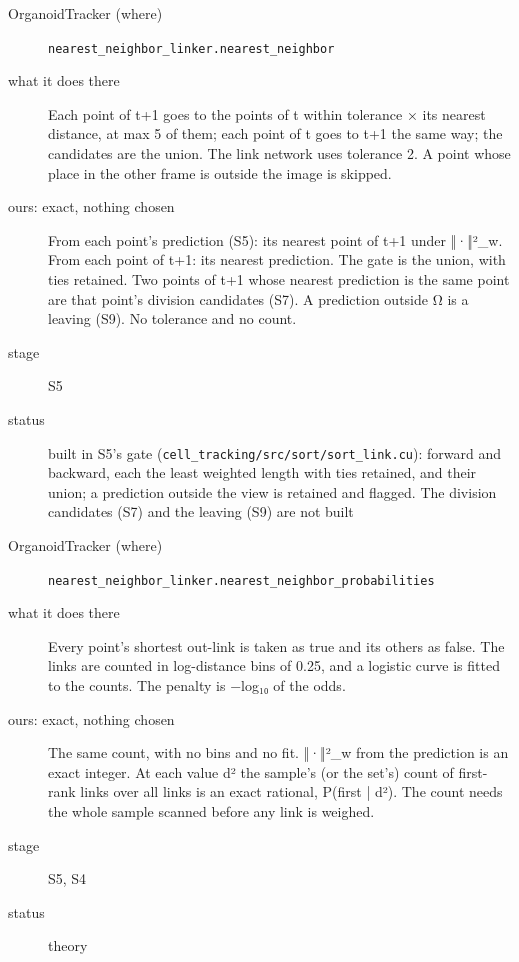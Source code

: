 \begin{description}
\item[{OrganoidTracker (where)}] \texttt{nearest\_\allowbreak{}neighbor\_\allowbreak{}linker.\allowbreak{}nearest\_\allowbreak{}neighbor}
\item[{what it does there}] Each point of t+1 goes to the points of t within tolerance × its nearest distance, at max 5 of them; each point of t goes to t+1 the same way; the candidates are the union. The link network uses tolerance 2. A point whose place in the other frame is outside the image is skipped.
\item[{ours: exact, nothing chosen}] From each point's prediction (S5): its nearest point of t+1 under ‖·‖²\_\allowbreak{}w. From each point of t+1: its nearest prediction. The gate is the union, with ties retained. Two points of t+1 whose nearest prediction is the same point are that point's division candidates (S7). A prediction outside Ω is a leaving (S9). No tolerance and no count.
\item[{stage}] S5
\item[{status}] built in S5's gate (\texttt{cell\_\allowbreak{}tracking/\allowbreak{}src/\allowbreak{}sort/\allowbreak{}sort\_\allowbreak{}link.\allowbreak{}cu}): forward and backward, each the least weighted length with ties retained, and their union; a prediction outside the view is retained and flagged. The division candidates (S7) and the leaving (S9) are not built
\end{description}

\begin{description}
\item[{OrganoidTracker (where)}] \texttt{nearest\_\allowbreak{}neighbor\_\allowbreak{}linker.\allowbreak{}nearest\_\allowbreak{}neighbor\_\allowbreak{}probabilities}
\item[{what it does there}] Every point's shortest out-link is taken as true and its others as false. The links are counted in log-distance bins of 0.25, and a logistic curve is fitted to the counts. The penalty is −log₁₀ of the odds.
\item[{ours: exact, nothing chosen}] The same count, with no bins and no fit. ‖·‖²\_\allowbreak{}w from the prediction is an exact integer. At each value d² the sample's (or the set's) count of first-rank links over all links is an exact rational, P(first | d²). The count needs the whole sample scanned before any link is weighed.
\item[{stage}] S5, S4
\item[{status}] theory
\end{description}

